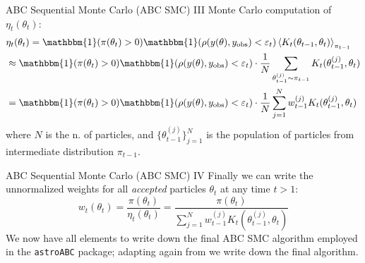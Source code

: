 \documentclass{beamer}
\theoremstyle{remark}
\begin{document}
\begin{frame}{ABC Sequential Monte Carlo (ABC SMC) III}
Monte Carlo computation of $\eta_t(\theta_t)$:
\begin{equation*}
    \begin{split}
        & \eta_t(\theta_t) = \mathbbm{1}(\pi(\theta_t) > 0)\mathbbm{1}(\rho(y(\theta), y_{\text{obs}}) < \varepsilon_t) \expval{K_t(\theta_{t-1}, \theta_t)}_{\pi_{t-1}} \\
         & \approx \mathbbm{1}(\pi(\theta_t) > 0)\mathbbm{1}(\rho(y(\theta), y_{\text{obs}}) < \varepsilon_t) \cdot \frac{1}{N} \sum_{\theta_{t-1}^{(j)} \sim \pi_{t-1}} K_t(\theta_{t-1}^{(j)}, \theta_t) \\
         & = \mathbbm{1}(\pi(\theta_t) > 0)\mathbbm{1}(\rho(y(\theta), y_{\text{obs}}) < \varepsilon_t) \cdot \frac{1}{N} \sum_{j=1}^N w_{t-1}^{(j)} K_t(\theta_{t-1}^{(j)}, \theta_t)
    \end{split}
\end{equation*}
where $N$ is the n. of particles, and $\{\theta_{t-1}^{(j)}\}_{j=1}^N$ is the population of particles from intermediate distribution $\pi_{t-1}$. 
\end{frame}

\begin{frame}{ABC Sequential Monte Carlo (ABC SMC) IV}
Finally we can write the unnormalized weights for all \emph{accepted} particles $\theta_t$ at any time $t > 1$:
\begin{equation*}
    w_t(\theta_t) = \frac{\pi(\theta_t)}{\eta_t(\theta_t)} = \frac{\pi(\theta_t)}{\sum_{j=1}^N w_{t-1}^{(j)} K_t(\theta_{t-1}^{(j)}, \theta_t)}
\end{equation*}
We now have all elements to write down the final ABC SMC algorithm employed in the \texttt{astroABC} package; adapting again from \cite{abc_smc} we write down the final algorithm.
\end{frame}
\end{document}
